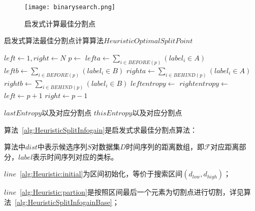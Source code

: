 \begin{figure}[H] %
	\centering
	\texttt{[image: binarysearch.png]}
	\caption{启发式计算最佳分割点}
	\label{fig:binarysearch}
\end{figure}

\begin{breakablealgorithm}
	\caption{启发式算法最佳分割点计算算法$HeuristicOptimalSplitPoint$}
	\label{alg:HeuristicSplitInfogain}
	\begin{algorithmic}[1]
			\State $left \gets 1,right \gets N$  \label{alg:Heuristic:initial}
				\State $p \gets $   \label{alg:Heuristic:partion}
				\State $lefta \gets \sum_{i\in BEFORE(p)}(label_i\in A)$ \label{alg:Heuristic:beforecalcentropy}
				\State $leftb \gets \sum_{i\in BEFORE(p)}(label_i\in B)$
				\State $righta \gets  \sum_{i \in BEHIND(p)}(label_i \in A)$
				\State $rightb \gets  \sum_{i \in BEHIND(p)}(label_i \in B)$
				\State $leftentropy \gets $ 
				\State $rightentropy \gets $  \label{alg:Heuristic:aftercalcentropy}
				  \label{alg:Heuristic:compare}
					\State $left \gets p+1$
				\Else
					\State $right \gets p-1$
				\EndIf
				
				  \label{alg:Heuristic:stop}
					\State \Return $lastEntropy$以及对应分割点
				\EndIf
			\EndWhile
			\State \Return $thisEntropy$以及对应分割点
		\EndFunction
	\end{algorithmic}
\end{breakablealgorithm}

算法~\ref{alg:HeuristicSplitInfogain}是启发式求最佳分割点算法：

算法中$dist$中表示候选序列$S$对数据集$D$时间序列的距离数组，即$\mathcal{F}$对应距离部分，$label$表示时间序列对应的类标。

$line$~\ref{alg:Heuristic:initial}为区间初始化，等价于搜索区间$(d_{low},d_{high})$；

$line$~\ref{alg:Heuristic:partion}是按照区间最后一个元素为切割点进行切割，详见算法~\ref{alg:HeuristicSplitInfogainBase}；


